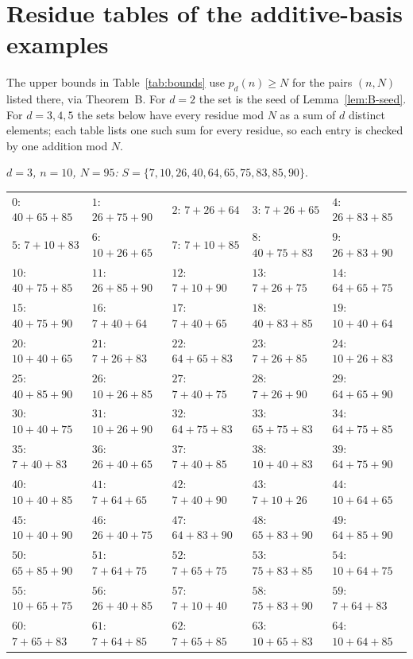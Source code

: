 \section{Residue tables of the additive-basis examples}\label{sec:B-examples}

The upper bounds in Table~\ref{tab:bounds} use $p_d(n) \ge N$ for the pairs $(n, N)$ listed there,
via Theorem~B. For $d = 2$ the set is the seed of Lemma~\ref{lem:B-seed}. For $d = 3, 4, 5$ the sets below
have every residue mod $N$ as a sum of $d$ distinct elements; each table lists one such sum for every
residue, so each entry is checked by one addition mod $N$.

\emph{$d = 3$, $n = 10$, $N = 95$:} $S = \{7, 10, 26, 40, 64, 65, 75, 83, 85, 90\}$.
\begin{center}\scriptsize
\begin{tabular}{lllll}
$0$: $40+65+85$ & $1$: $26+75+90$ & $2$: $7+26+64$ & $3$: $7+26+65$ & $4$: $26+83+85$\\
$5$: $7+10+83$ & $6$: $10+26+65$ & $7$: $7+10+85$ & $8$: $40+75+83$ & $9$: $26+83+90$\\
$10$: $40+75+85$ & $11$: $26+85+90$ & $12$: $7+10+90$ & $13$: $7+26+75$ & $14$: $64+65+75$\\
$15$: $40+75+90$ & $16$: $7+40+64$ & $17$: $7+40+65$ & $18$: $40+83+85$ & $19$: $10+40+64$\\
$20$: $10+40+65$ & $21$: $7+26+83$ & $22$: $64+65+83$ & $23$: $7+26+85$ & $24$: $10+26+83$\\
$25$: $40+85+90$ & $26$: $10+26+85$ & $27$: $7+40+75$ & $28$: $7+26+90$ & $29$: $64+65+90$\\
$30$: $10+40+75$ & $31$: $10+26+90$ & $32$: $64+75+83$ & $33$: $65+75+83$ & $34$: $64+75+85$\\
$35$: $7+40+83$ & $36$: $26+40+65$ & $37$: $7+40+85$ & $38$: $10+40+83$ & $39$: $64+75+90$\\
$40$: $10+40+85$ & $41$: $7+64+65$ & $42$: $7+40+90$ & $43$: $7+10+26$ & $44$: $10+64+65$\\
$45$: $10+40+90$ & $46$: $26+40+75$ & $47$: $64+83+90$ & $48$: $65+83+90$ & $49$: $64+85+90$\\
$50$: $65+85+90$ & $51$: $7+64+75$ & $52$: $7+65+75$ & $53$: $75+83+85$ & $54$: $10+64+75$\\
$55$: $10+65+75$ & $56$: $26+40+85$ & $57$: $7+10+40$ & $58$: $75+83+90$ & $59$: $7+64+83$\\
$60$: $7+65+83$ & $61$: $7+64+85$ & $62$: $7+65+85$ & $63$: $10+65+83$ & $64$: $10+64+85$\\

\end{tabular}
\end{center}

